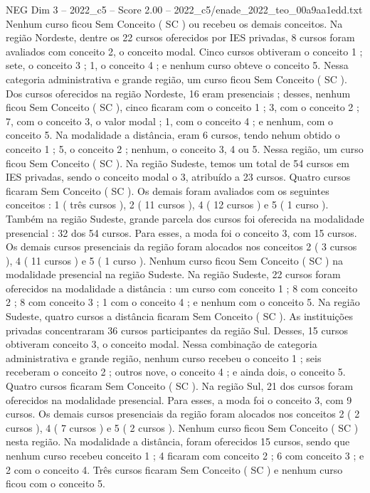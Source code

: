 \begin{textsample}{NEG Dim 3 – 2022\_c5 – Score 2.00 – 2022\_c5/enade\_2022\_teo\_00a9aa1edd.txt}
Nenhum curso ficou Sem Conceito ( SC ) ou recebeu os demais conceitos.
Na região Nordeste, dentre os 22 cursos oferecidos por IES privadas, 8 cursos foram avaliados com conceito 2, o conceito modal.
Cinco cursos obtiveram o conceito 1 ; sete, o conceito 3 ; 1, o conceito 4 ; e nenhum curso obteve o conceito 5.
Nessa categoria administrativa e grande região, um curso ficou Sem Conceito ( SC ).
Dos cursos oferecidos na região Nordeste, 16 eram presenciais ; desses, nenhum ficou Sem Conceito ( SC ), cinco ficaram com o conceito 1 ; 3, com o conceito 2 ; 7, com o conceito 3, o valor modal ; 1, com o conceito 4 ; e nenhum, com o conceito 5.
Na modalidade a distância, eram 6 cursos, tendo nehum obtido o conceito 1 ; 5, o conceito 2 ; nenhum, o conceito 3, 4 ou 5.
Nessa região, um curso ficou Sem Conceito ( SC ).
Na região Sudeste, temos um total de 54 cursos em IES privadas, sendo o conceito modal o 3, atribuído a 23 cursos.
Quatro cursos ficaram Sem Conceito ( SC ).
Os demais foram avaliados com os seguintes conceitos : 1 ( três cursos ), 2 ( 11 cursos ), 4 ( 12 cursos ) e 5 ( 1 curso ).
Também na região Sudeste, grande parcela dos cursos foi oferecida na modalidade presencial : 32 dos 54 cursos.
Para esses, a moda foi o conceito 3, com 15 cursos.
Os demais cursos presenciais da região foram alocados nos conceitos 2 ( 3 cursos ), 4 ( 11 cursos ) e 5 ( 1 curso ).
Nenhum curso ficou Sem Conceito ( SC ) na modalidade presencial na região Sudeste.
Na região Sudeste, 22 cursos foram oferecidos na modalidade a distância : um curso com conceito 1 ; 8 com conceito 2 ; 8 com conceito 3 ; 1 com o conceito 4 ; e nenhum com o conceito 5.
Na região Sudeste, quatro cursos a distância ficaram Sem Conceito ( SC ).
As instituições privadas concentraram 36 cursos participantes da região Sul.
Desses, 15 cursos obtiveram conceito 3, o conceito modal.
Nessa combinação de categoria administrativa e grande região, nenhum curso recebeu o conceito 1 ; seis receberam o conceito 2 ; outros nove, o conceito 4 ; e ainda dois, o conceito 5.
Quatro cursos ficaram Sem Conceito ( SC ).
Na região Sul, 21 dos cursos foram oferecidos na modalidade presencial.
Para esses, a moda foi o conceito 3, com 9 cursos.
Os demais cursos presenciais da região foram alocados nos conceitos 2 ( 2 cursos ), 4 ( 7 cursos ) e 5 ( 2 cursos ).
Nenhum curso ficou Sem Conceito ( SC ) nesta região.
Na modalidade a distância, foram oferecidos 15 cursos, sendo que nenhum curso recebeu conceito 1 ; 4 ficaram com conceito 2 ; 6 com conceito 3 ; e 2 com o conceito 4.
Três cursos ficaram Sem Conceito ( SC ) e nenhum curso ficou com o conceito 5.

\end{textsample}
